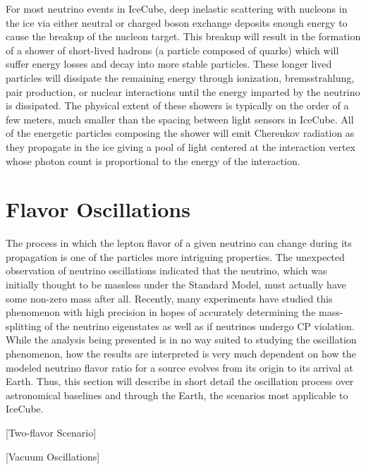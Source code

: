 \documentclass{gatech-thesis}
\begin{document}
For most neutrino events in IceCube, deep inelastic scattering with nucleons in the ice via either neutral or charged boson exchange deposits enough energy to cause the breakup of the nucleon target. This breakup will result in the formation of a shower of short-lived hadrons (a particle composed of quarks) which will suffer energy losses and decay into more stable particles. These longer lived particles will dissipate the remaining energy through ionization, bremsstrahlung, pair production, or nuclear interactions until the energy imparted by the neutrino is dissipated. The physical extent of these showers is typically on the order of a few meters, much smaller than the spacing between light sensors in IceCube. All of the energetic particles composing the shower will emit Cherenkov radiation as they propagate in the ice giving a pool of light centered at the interaction vertex whose photon count is proportional to the energy of the interaction.


\section{Flavor Oscillations}
The process in which the lepton flavor of a given neutrino can change during its propagation is one of the particles more intriguing properties. The unexpected observation of neutrino oscillations indicated that the neutrino, which was initially thought to be massless under the Standard Model, must actually have some non-zero mass after all. Recently, many experiments have studied this phenomenon with high precision in hopes of accurately determining the mass-splitting of the neutrino eigenstates as well as if neutrinos undergo CP violation. While the analysis being presented is in no way suited to studying the oscillation phenomenon, how the results are interpreted is very much dependent on how the modeled neutrino flavor ratio for a source evolves from its origin to its arrival at Earth. Thus, this section will describe in short detail the oscillation process over astronomical baselines and through the Earth, the scenarios most applicable to IceCube.

[Two-flavor Scenario]

[Vacuum Oscillations]
\end{document}
